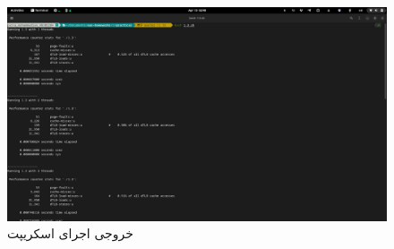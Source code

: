 \documentclass{article}
\begin{document}
\begin{figure}[H]
\centering
\includegraphics[width=\textwidth]{1.3.png}
\caption{خروجی اجرای اسکریپت}
\label{fig:1.3}
\end{figure}
\end{document}
